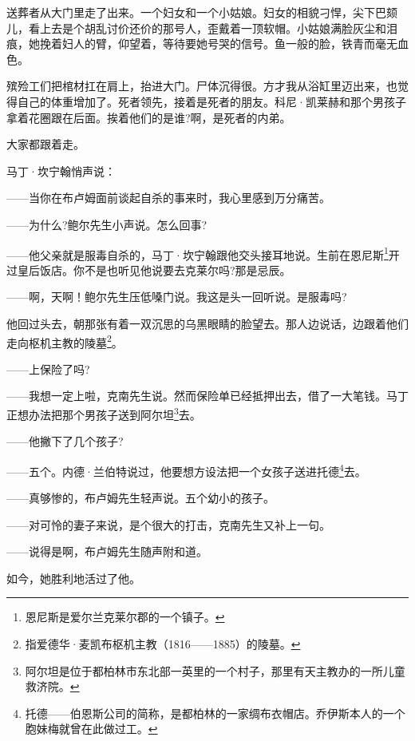 \par 送葬者从大门里走了出来。一个妇女和一个小姑娘。妇女的相貌刁悍，尖下巴颏儿，看上去是个胡乱讨价还价的那号人，歪戴着一顶软帽。小姑娘满脸灰尘和泪痕，她挽着妇人的臂，仰望着，等待要她号哭的信号。鱼一般的脸，铁青而毫无血色。
\par 殡殓工们把棺材扛在肩上，抬进大门。尸体沉得很。方才我从浴缸里迈出来，也觉得自己的体重增加了。死者领先，接着是死者的朋友。科尼·凯莱赫和那个男孩子拿着花圈跟在后面。挨着他们的是谁?啊，是死者的内弟。
\par 大家都跟着走。
\par 马丁·坎宁翰悄声说：
\par ——当你在布卢姆面前谈起自杀的事来时，我心里感到万分痛苦。
\par ——为什么?鲍尔先生小声说。怎么回事?
\par ——他父亲就是服毒自杀的，马丁·坎宁翰跟他交头接耳地说。生前在恩尼斯\footnote{恩尼斯是爱尔兰克莱尔郡的一个镇子。}开过皇后饭店。你不是也听见他说要去克莱尔吗?那是忌辰。
\par ——啊，天啊！鲍尔先生压低嗓门说。我这是头一回听说。是服毒吗?
\par 他回过头去，朝那张有着一双沉思的乌黑眼睛的脸望去。那人边说话，边跟着他们走向枢机主教的陵墓\footnote{指爱德华·麦凯布枢机主教（1816——1885）的陵墓。}。
\par ——上保险了吗?
\par ——我想一定上啦，克南先生说。然而保险单已经抵押出去，借了一大笔钱。马丁正想办法把那个男孩子送到阿尔坦\footnote{阿尔坦是位于都柏林市东北部一英里的一个村子，那里有天主教办的一所儿童救济院。}去。
\par ——他撇下了几个孩子?
\par ——五个。内德·兰伯特说过，他要想方设法把一个女孩子送进托德\footnote{托德——伯恩斯公司的简称，是都柏林的一家绸布衣帽店。乔伊斯本人的一个胞妹梅就曾在此做过工。}去。
\par ——真够惨的，布卢姆先生轻声说。五个幼小的孩子。
\par ——对可怜的妻子来说，是个很大的打击，克南先生又补上一句。
\par ——说得是啊，布卢姆先生随声附和道。
\par 如今，她胜利地活过了他。

